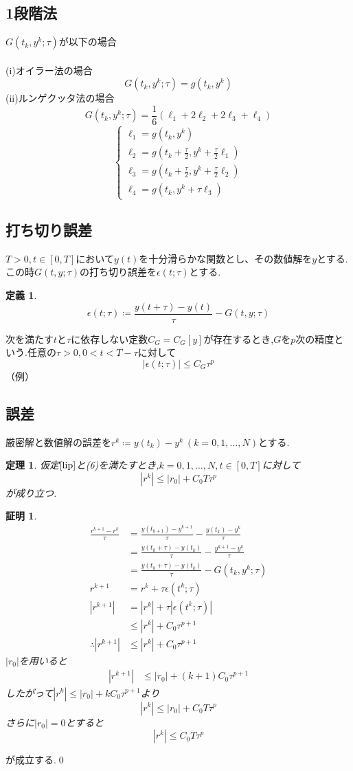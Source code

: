 \documentclass[a4,12pt]{article}
\newtheorem{thm}{定理}
\newtheorem{dfn}{定義}
\newtheorem{prf}{証明}
\begin{document}
\subsection{1段階法}
$G(t_k,y^k;\tau)$が以下の場合\\
\\(i)オイラー法の場合
\[G(t_k,y^k;\tau)=g(t_k,y^k)\]
(ii)ルンゲクッタ法の場合
\[G(t_k,y^k;\tau)=\frac{1}{6}(\ell_1+2\ell_2+2\ell_3+\ell_4)\]
\[\begin{cases}
\ell_1=g(t_k,y^k)\\
\ell_2=g(t_k+\displaystyle\frac{\tau}{2},y^k+\frac{\tau}{2}\ell_1)\\
\ell_3=g(t_k+\displaystyle\frac{\tau}{2},y^k+\frac{\tau}{2}\ell_2)\\ 
\ell_4=g(t_k,y^k+\tau \ell_3)
\end{cases}\]
\subsection{打ち切り誤差}
$T>0,t\in[0,T]$において$y(t)$を十分滑らかな関数とし、その数値解を$y$とする.この時$G(t,y;\tau)$の打ち切り誤差を$\epsilon(t;\tau)$とする.
\begin{dfn}\[\epsilon(t;\tau)\coloneqq\frac{y(t+\tau)-y(t)}{\tau}-G(t,y;\tau)\]\end{dfn}
次を満たす$t$と$\tau$に依存しない定数$C_G=C_G[y]$が存在するとき,$G$を$p$次の精度という.任意の$\tau>0,0<t<T-\tau$に対して
\begin{equation}
|\epsilon(t;\tau)|\leq C_G\tau^p
\end{equation}
（例）
\subsection{誤差}
厳密解と数値解の誤差を$r^k\coloneqq y(t_k)-y^k\ (k=0,1,\ldots,N)$とする.
\begin{thm}\label{th1}仮定$\ref{lip}$と(6)を満たすとき,$k=0,1,\ldots ,N,t\in[0,T]$に対して
\begin{equation}|r^{k}|\leq |r_0|+C_0T\tau^{p}\end{equation}
が成り立つ.
\end{thm}
\begin{prf}
\[\begin{split}
\frac{r^{k+1}-r^k}{\tau}&=\frac{y(t_{k+1})-y^{k+1}}{\tau}- \frac{y(t_k)-y^k}{\tau}\\
&=\frac{y(t_k+\tau)-y(t_k)}{\tau}- \frac{y^{k+1}-y^k}{\tau}\\
&=\frac{y(t_k+\tau)-y(t_k)}{\tau}-G(t_k,y^k;\tau)\\
r^{k+1}&=r^k+\tau\epsilon(t^k;\tau)\\
|r^{k+1}|&=|r^k|+\tau |\epsilon(t^k;\tau)|\\
&\leq |r^k|+C_0\tau^{p+1}\\
\therefore |r^{k+1}|&\leq |r^k|+C_0\tau^{p+1}
\end{split}\]
$|r_0|$を用いると
\[\begin{split}
|r^{k+1}|&\leq |r_0|+(k+1)C_0\tau^{p+1}
\end{split}\]
したがって$|r^{k}|\leq |r_0|+kC_0\tau^{p+1}$より
\[|r^{k}|\leq |r_0|+C_0T\tau^{p}\]
さらに$|r_0|=0$とすると
\[|r^{k}|\leq C_0T\tau^{p}\]
\end{prf}
が成立する.\qed
\end{document}
